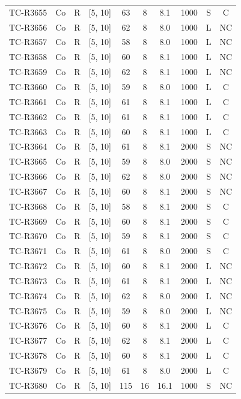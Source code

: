 \begin{longtable}{lccccccccc}
TC-R3655 & Co & R & [5, 10] & 63 & 8 & 8.1 & 1000 & S & C \\
TC-R3656 & Co & R & [5, 10] & 62 & 8 & 8.0 & 1000 & L & NC \\
TC-R3657 & Co & R & [5, 10] & 58 & 8 & 8.0 & 1000 & L & NC \\
TC-R3658 & Co & R & [5, 10] & 60 & 8 & 8.1 & 1000 & L & NC \\
TC-R3659 & Co & R & [5, 10] & 62 & 8 & 8.1 & 1000 & L & NC \\
TC-R3660 & Co & R & [5, 10] & 59 & 8 & 8.0 & 1000 & L & C \\
TC-R3661 & Co & R & [5, 10] & 61 & 8 & 8.1 & 1000 & L & C \\
TC-R3662 & Co & R & [5, 10] & 61 & 8 & 8.1 & 1000 & L & C \\
TC-R3663 & Co & R & [5, 10] & 60 & 8 & 8.1 & 1000 & L & C \\
TC-R3664 & Co & R & [5, 10] & 61 & 8 & 8.1 & 2000 & S & NC \\
TC-R3665 & Co & R & [5, 10] & 59 & 8 & 8.0 & 2000 & S & NC \\
TC-R3666 & Co & R & [5, 10] & 62 & 8 & 8.0 & 2000 & S & NC \\
TC-R3667 & Co & R & [5, 10] & 60 & 8 & 8.1 & 2000 & S & NC \\
TC-R3668 & Co & R & [5, 10] & 58 & 8 & 8.1 & 2000 & S & C \\
TC-R3669 & Co & R & [5, 10] & 60 & 8 & 8.1 & 2000 & S & C \\
TC-R3670 & Co & R & [5, 10] & 59 & 8 & 8.1 & 2000 & S & C \\
TC-R3671 & Co & R & [5, 10] & 61 & 8 & 8.0 & 2000 & S & C \\
TC-R3672 & Co & R & [5, 10] & 60 & 8 & 8.1 & 2000 & L & NC \\
TC-R3673 & Co & R & [5, 10] & 61 & 8 & 8.1 & 2000 & L & NC \\
TC-R3674 & Co & R & [5, 10] & 62 & 8 & 8.0 & 2000 & L & NC \\
TC-R3675 & Co & R & [5, 10] & 59 & 8 & 8.0 & 2000 & L & NC \\
TC-R3676 & Co & R & [5, 10] & 60 & 8 & 8.1 & 2000 & L & C \\
TC-R3677 & Co & R & [5, 10] & 62 & 8 & 8.1 & 2000 & L & C \\
TC-R3678 & Co & R & [5, 10] & 60 & 8 & 8.1 & 2000 & L & C \\
TC-R3679 & Co & R & [5, 10] & 61 & 8 & 8.0 & 2000 & L & C \\
TC-R3680 & Co & R & [5, 10] & 115 & 16 & 16.1 & 1000 & S & NC \\

\end{longtable}
